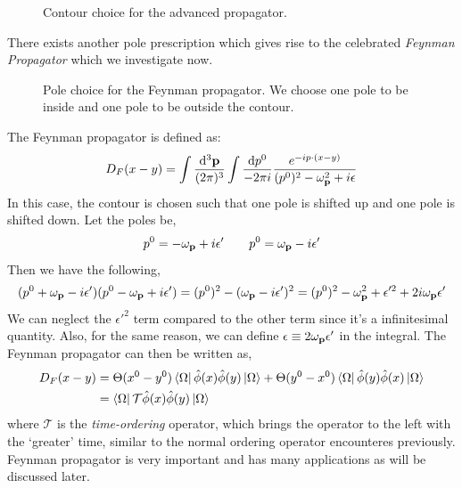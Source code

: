 \begin{figure}[H]
    \centering 

\caption{Contour choice for the advanced propagator. }
\end{figure}
\noindent
There exists another pole prescription which gives rise to the celebrated \textit{Feynman Propagator} which we investigate now. 
\begin{figure}[H]
    \centering 

\caption{Pole choice for the Feynman propagator. We choose one pole to be inside and one pole to be outside the contour.}
\end{figure}
\noindent
The Feynman propagator is defined as:
$$D_F(x-y) =  \int\frac{\dd^3\vb{{\vb{p}}}}{(2\pi)^3} \int\frac{\dd p^0}{-2\pi i} \frac{e^{-i p\cdot (x-y)}}{(p^0)^2 - \omega_{\vb{{p}}}^2 + i\epsilon}$$
In this case, the contour is chosen such that one pole is shifted up and one pole is shifted down. Let the poles be,
$$p^0 = -\omega_{\vb{{p}}} +i\epsilon' \qquad p^0 = \omega_{\vb{{p}}} -i\epsilon' $$
Then we have the following,
$$(p^0+\omega_{\vb{{p}}}-i\epsilon')(p^0-\omega_{\vb{{p}}}+i\epsilon') = (p^0)^2 - (\omega_{\vb{{p}}}  -i\epsilon')^2=(p^0)^2 - \omega_{\vb{{p}}}^2 +\epsilon'^2 + 2i\omega_{\vb{{p}}} \epsilon'$$
We can neglect the $\epsilon'^2$ term compared to the other term since it's a infinitesimal quantity. Also, for the same reason, we can define $\epsilon \equiv 2\omega_{\vb{{p}}} \epsilon'$ in the integral. The Feynman propagator can then be written as,
\begin{align*}
    D_F(x-y) &=  \Theta(x^0-y^0)\bra{\Omega} {\hat{\phi}(x)}{ \hat{\phi}(y)}\ket{\Omega} + \Theta(y^0-x^0)\bra{\Omega} {\hat{\phi}(y)}{ \hat{\phi}(x)}\ket{\Omega}\\
    &=\bra{\Omega} \mathcal{T}\hat{\phi}{(x)}\hat{\phi}{(y)}\ket{\Omega}
\end{align*}
where $\mathcal{T}$ is the \textit{time-ordering} operator, which brings the operator to the left with the `greater' time, similar to the normal ordering operator encounteres previously. \\[0.2cm]
Feynman propagator is very important and has many applications as will be discussed later. 